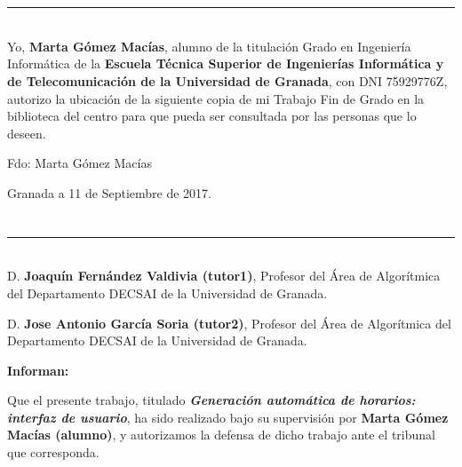 \chapter*{}
\thispagestyle{empty}

\noindent\rule[-1ex]{\textwidth}{2pt}\\[4.5ex]

Yo, \textbf{Marta Gómez Macías}, alumno de la titulación Grado en Ingeniería Informática de la \textbf{Escuela Técnica Superior
de Ingenierías Informática y de Telecomunicación de la Universidad de Granada}, con DNI 75929776Z, autorizo la
ubicación de la siguiente copia de mi Trabajo Fin de Grado en la biblioteca del centro para que pueda ser
consultada por las personas que lo deseen.

\vspace{6cm}

\noindent Fdo: Marta Gómez Macías

\vspace{2cm}

\begin{flushright}
Granada a 11 de Septiembre de 2017.
\end{flushright}


\chapter*{}
\thispagestyle{empty}

\noindent\rule[-1ex]{\textwidth}{2pt}\\[4.5ex]

D. \textbf{Joaquín Fernández Valdivia (tutor1)}, Profesor del Área de Algorítmica del Departamento DECSAI de la Universidad de Granada.

\vspace{0.5cm}

D. \textbf{Jose Antonio García Soria (tutor2)}, Profesor del Área de Algorítmica del Departamento DECSAI de la Universidad de Granada.


\vspace{0.5cm}

\textbf{Informan:}

\vspace{0.5cm}

Que el presente trabajo, titulado \textit{\textbf{Generación automática de horarios: interfaz de usuario}},
ha sido realizado bajo su supervisión por \textbf{Marta Gómez Macías (alumno)}, y autorizamos la defensa de dicho trabajo ante el tribunal
que corresponda.

